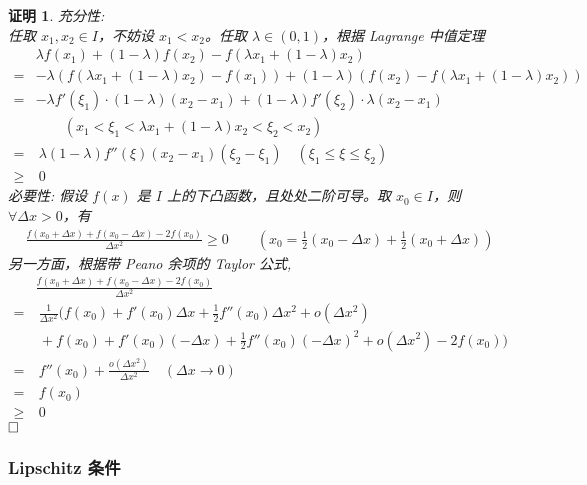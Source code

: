 \documentclass{ctexart}
\newcommand{\。}{．} %
\newenvironment{lanse}{
    \begin{tcolorbox}[enhanced, breakable, colback=qlan, boxrule=0pt, frame hidden,
        borderline west={0.7mm}{0.1mm}{slan}]
    }
    {\end{tcolorbox}}
\theoremstyle{t} %
\newtheorem*{zmhj}{\color{slan} 证明}
\newenvironment{zm}{\begin{lanse}\begin{zmhj}}{$\hfill \square$\end{zmhj}\end{lanse}}
\begin{document}
\begin{zm}
    充分性: \\
    任取 $x_1, x_2 \in I$，不妨设 $x_1 < x_2$。任取 $\lambda \in (0,1)$，根据 Lagrange 中值定理
    \begin{align*}
        & \lambda f(x_1) + (1 - \lambda) f(x_2) - f(\lambda x_1 + (1 - \lambda)x_2) \\
        = & -\lambda \left( f(\lambda x_1 + (1 - \lambda)x_2) - f(x_1) \right) + (1 - \lambda) \left( f(x_2) - f(\lambda x_1 + (1 - \lambda)x_2) \right) \\
        = & -\lambda f'(\xi_1) \cdot (1 - \lambda)(x_2 - x_1) + (1 - \lambda)f'(\xi_2) \cdot \lambda(x_2 - x_1) \quad \\
        & \qquad (x_1 < \xi_1 < \lambda x_1 + (1 - \lambda)x_2 < \xi_2 < x_2) \\
        = & \ \lambda (1 - \lambda) f''(\xi) (x_2 - x_1)(\xi_2 - \xi_1) \quad (\xi_1 \leq \xi \leq \xi_2) \\
        \geqslant & \  0
    \end{align*}
    必要性: 假设 $f(x)$ 是 $I$ 上的下凸函数，且处处二阶可导。取 $x_0 \in I$，则 $\forall \Delta x > 0$，有
    \begin{align*}
        \frac{f(x_0 + \Delta x) + f(x_0 - \Delta x) - 2f(x_0)}{\Delta x^2} \geq 0 
        \qquad \left( x_0 = \frac{1}{2} (x_0 - \Delta x) + \frac{1}{2}(x_0 + \Delta x) \right)
    \end{align*}
    另一方面，根据带 Peano 余项的 Taylor 公式, 
    \begin{align*}
        & \frac{f(x_0 + \Delta x) + f(x_0 - \Delta x) - 2f(x_0)}{\Delta x^2} \\
        = & \ \frac{1}{\Delta x^2} \Bigg( f(x_0) + f'(x_0) \Delta x + \frac{1}{2} f''(x_0) \Delta x^2 + o(\Delta x^2)  \\
        & \  + f(x_0) + f'(x_0)(-\Delta x) + \frac{1}{2} f''(x_0)(-\Delta x)^2 + o(\Delta x^2) - 2f(x_0) \Bigg)\\
        = &\  f''(x_0) + \frac{o(\Delta x^2)}{\Delta x^2} \quad (\Delta x \to 0) \\
        = & \ f(x_0) \\
        \geqslant & \ 0
    \end{align*}
\end{zm}


\subsubsection{Lipschitz 条件}
\end{document}

